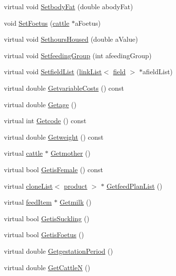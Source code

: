 \begin{DoxyCompactItemize}
virtual void \hyperlink{classcattle_a356e6940e7396a01a860fbc853ecc144}{SetbodyFat} (double abodyFat)
\item 
void \hyperlink{classcattle_a2656ed54ea449daa5272f721379da95b}{SetFoetus} (\hyperlink{classcattle}{cattle} $\ast$aFoetus)
\item 
virtual void \hyperlink{classcattle_abc88c494953dc706add28e0839bdef40}{SethoursHoused} (double aValue)
\item 
virtual void \hyperlink{classcattle_a9756ddb6e5fdf7b732690455d067bcee}{SetfeedingGroup} (int afeedingGroup)
\item 
virtual void \hyperlink{classcattle_a75e4074bb40b9683fcf0b5053247164f}{SetfieldList} (\hyperlink{classlink_list}{linkList}$<$ \hyperlink{classfield}{field} $>$ $\ast$afieldList)
\item 
virtual double \hyperlink{classcattle_ac0d5f90c27a81005db97ff5d58d5607d}{GetvariableCosts} () const 
\item 
virtual double \hyperlink{classcattle_ab014adfe186a96d87be23df0c4bf47eb}{Getage} ()
\item 
virtual int \hyperlink{classcattle_ad6b3b02f1b9c39b7872c5b4b875b987d}{Getcode} () const 
\item 
virtual double \hyperlink{classcattle_a32f9c2c17b16e891f8e208754865d734}{Getweight} () const 
\item 
virtual \hyperlink{classcattle}{cattle} $\ast$ \hyperlink{classcattle_acc71b376de54129fb52a75aa17476cb0}{Getmother} ()
\item 
virtual bool \hyperlink{classcattle_a1f53f6f6b44193909bd6524df7c90169}{GetisFemale} () const 
\item 
virtual \hyperlink{classclone_list}{cloneList}$<$ \hyperlink{classproduct}{product} $>$ $\ast$ \hyperlink{classcattle_ac087867a732ba9ae7821d1d61928908f}{GetfeedPlanList} ()
\item 
virtual \hyperlink{classfeed_item}{feedItem} $\ast$ \hyperlink{classcattle_a0e993d2a22fd76bb0d1adfb0164eb5d8}{Getmilk} ()
\item 
virtual bool \hyperlink{classcattle_a1894bf94cd8490350bd5f927aa4453b4}{GetisSuckling} ()
\item 
virtual bool \hyperlink{classcattle_aa137de147bb60b1f2cc1558167a0220d}{GetisFoetus} ()
\item 
virtual double \hyperlink{classcattle_a7bda83b3832babf60809ada5e9e785ab}{GetgestationPeriod} ()
\item 
virtual double \hyperlink{classcattle_a119738767d9cf6ef205a9e097f5f0fd6}{GetCattleN} ()

\end{DoxyCompactItemize}
